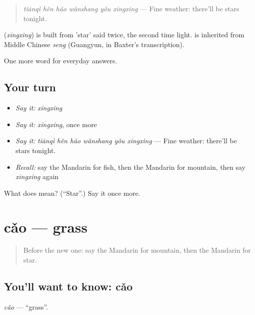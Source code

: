 \begin{quote}
\textbf{} \emph{tiānqì hěn hǎo wǎnshang yǒu xīngxing} — Fine weather: there'll be stars tonight.
\end{quote}

\begin{cousinweb}
\textbf{} (\emph{xīngxing}) is built from  'star' said twice, the second time light.  is inherited from Middle Chinese \emph{seng} (Guangyun, in Baxter's transcription).
\end{cousinweb}

\begin{grammarlens}[title={What you've built}]
One more word for everyday answers.
\end{grammarlens}

\subsection*{Your turn}
\begin{itemize}
\raggedright
  \item \emph{Say it:} \emph{xīngxing}
  \item \emph{Say it:} \emph{xīngxing}, once more
  \item \emph{Say it:} \emph{tiānqì hěn hǎo wǎnshang yǒu xīngxing} — Fine weather: there'll be stars tonight.
  \item \emph{Recall:} say the Mandarin for fish, then the Mandarin for mountain, then say \emph{xīngxing} again
\end{itemize}

\begin{tcolorbox}[breakable,colback=teal!4,colframe=teal!35!black,title={Before you move on}]
What does  mean? (\textquotedblleft{}Star\textquotedblright{}.) Say it once more.
\end{tcolorbox}
\section[cǎo]{cǎo — grass}

\label{lesson:ZH-C68-cao}



\begin{quote}
Before the new one: say the Mandarin for mountain, then the Mandarin for star.
\end{quote}

\subsection*{You'll want to know: cǎo}
\emph{cǎo} — \textquotedblleft{}grass\textquotedblright{}.

